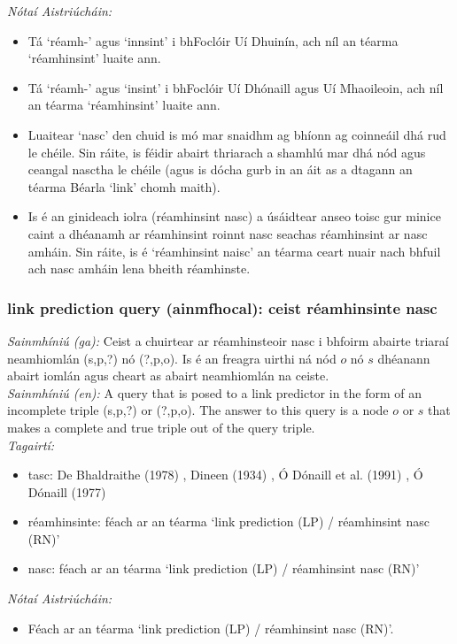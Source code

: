  \noindent \textit{Nótaí Aistriúcháin:}
\begin{itemize}
	\item Tá `réamh-' agus `innsint' i bhFoclóir Uí Dhuinín, ach níl an téarma `réamhinsint' luaite ann.
	\item Tá `réamh-' agus `insint' i bhFoclóir Uí Dhónaill agus Uí Mhaoileoin, ach níl an téarma `réamhinsint' luaite ann.
	\item Luaitear `nasc' den chuid is mó mar snaidhm ag bhíonn ag coinneáil dhá rud le chéile. Sin ráite, is féidir abairt thriarach a shamhlú mar dhá nód agus ceangal nasctha le chéile (agus is dócha gurb in an áit as a dtagann an téarma Béarla `link' chomh maith).
	\item Is é an ginideach iolra (réamhinsint nasc) a úsáidtear anseo toisc gur minice caint a dhéanamh ar réamhinsint roinnt nasc seachas réamhinsint ar nasc amháin. Sin ráite, is é `réamhinsint naisc' an téarma ceart nuair nach bhfuil ach nasc amháin lena bheith réamhinste.
\end{itemize}


\subsubsection*{link prediction query (ainmfhocal): ceist réamhinsinte nasc}
 \noindent \textit{Sainmhíniú (ga):} Ceist a chuirtear ar réamhinsteoir nasc i bhfoirm abairte triaraí neamhiomlán (s,p,?) nó (?,p,o). Is é an freagra uirthi ná nód $o$ nó $s$ dhéanann abairt iomlán agus cheart as abairt neamhiomlán na ceiste.
\\
 \noindent \textit{Sainmhíniú (en):} A query that is posed to a link predictor in the form of an incomplete triple (s,p,?) or (?,p,o). The answer to this query is a node $o$ or $s$ that makes a complete and true triple out of the query triple.
\\
 \noindent \textit{Tagairtí:}
\begin{itemize}
	\item tasc: De Bhaldraithe (1978) \cite{de-bhaldraithe}, Dineen (1934) \cite{dineen}, Ó Dónaill et al. (1991) \cite{focloir-beag}, Ó Dónaill (1977) \cite{odonaill}
	\item réamhinsinte: féach ar an téarma `link prediction (LP) / réamhinsint nasc (RN)'
	\item nasc: féach ar an téarma `link prediction (LP) / réamhinsint nasc (RN)'
\end{itemize}

 \noindent \textit{Nótaí Aistriúcháin:}
\begin{itemize}
	\item Féach ar an téarma `link prediction (LP) / réamhinsint nasc (RN)'.
\end{itemize}


